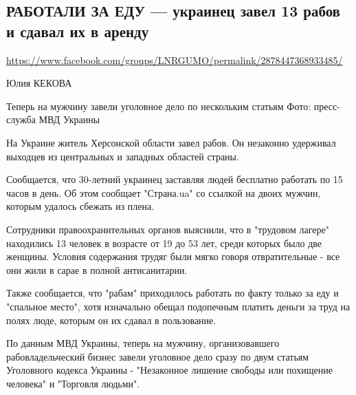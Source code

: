  
 
  
\subsection{РАБОТАЛИ ЗА ЕДУ --- украинец завел 13 рабов и сдавал их в аренду }
\label{sec:26_07_2020.fb.lnr.5}
\url{https://www.facebook.com/groups/LNRGUMO/permalink/2878447368933485/}


Юлия КЕКОВА

Теперь на мужчину завели уголовное дело по нескольким статьям Фото:
пресс-служба МВД Украины

На Украине житель Херсонской области завел рабов.  Он незаконно удерживал
выходцев из центральных и западных областей страны.

Сообщается, что 30-летний украинец заставляя людей бесплатно работать по 15
часов в день.  Об этом сообщает "Страна.ua" со ссылкой на двоих мужчин, которым
удалось сбежать из плена.

Сотрудники правоохранительных органов выяснили, что в "трудовом лагере"
находились 13 человек в возрасте от 19 до 53 лет, среди которых было две
женщины. Условия содержания трудяг были мягко говоря отвратительные - все они
жили в сарае в полной антисанитарии.

Также сообщается, что "рабам" приходилось работать по факту только за еду и
"спальное место", хотя изначально обещал подопечным платить деньги за труд на
полях люде, которым он их сдавал в пользование.

По данным МВД Украины, теперь на мужчину, организовавшего рабовладельческий
бизнес завели уголовное дело сразу по двум статьям Уголовного кодекса Украины -
"Незаконное лишение свободы или похищение человека" и "Торговля людьми".
  
